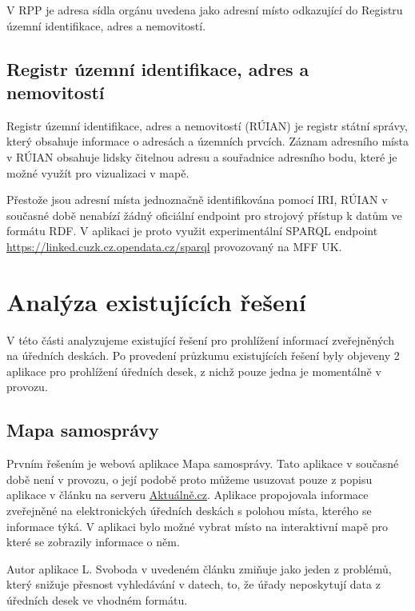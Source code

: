 V RPP je adresa sídla orgánu uvedena jako adresní místo odkazující do Registru územní identifikace, adres a nemovitostí.

\subsection{Registr územní identifikace, adres a nemovitostí}\label{subsec:ruian}

Registr územní identifikace, adres a nemovitostí (RÚIAN) \cite{RUIAN} je registr státní správy, který obsahuje informace o adresách a územních prvcích. Záznam adresního místa v RÚIAN obsahuje lidsky čitelnou adresu a souřadnice adresního bodu, které je možné využít pro vizualizaci v mapě.

Přestože jsou adresní místa jednoznačně identifikována pomocí IRI, RÚIAN v současné době nenabízí žádný oficiální endpoint pro strojový přístup k datům ve formátu RDF. V aplikaci je proto využit experimentální SPARQL endpoint \url{https://linked.cuzk.cz.opendata.cz/sparql} provozovaný na MFF UK.




\section{Analýza existujících řešení}\label{sec:analyza}

V této části analyzujeme existující řešení pro prohlížení informací zveřejněných na úředních deskách. Po provedení průzkumu existujících řešení byly objeveny 2 aplikace pro prohlížení úředních desek, z nichž pouze jedna je momentálně v provozu.

\subsection{Mapa samosprávy}

Prvním řešením je webová aplikace Mapa samosprávy. Tato aplikace v současné době není v provozu, o její podobě proto můžeme usuzovat pouze z popisu aplikace v článku na serveru \url{Aktuálně.cz}\cite{Aktualne}. Aplikace propojovala informace zveřejněné na elektronických úředních deskách s polohou místa, kterého se informace týká. V aplikaci bylo možné vybrat místo na interaktivní mapě pro které se zobrazily informace o něm.

Autor aplikace L. Svoboda v uvedeném článku zmiňuje jako jeden z problémů, který snižuje přesnost vyhledávání v datech, to, že úřady neposkytují data z úředních desek ve vhodném formátu. 

